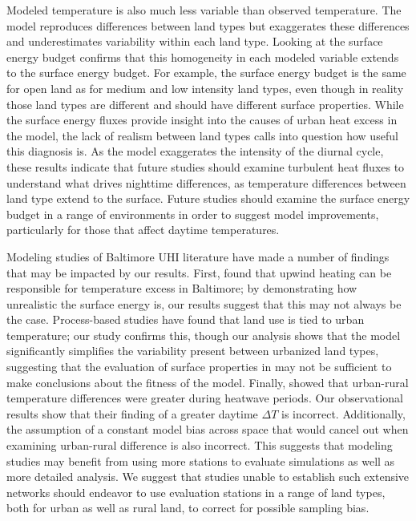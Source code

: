 Modeled temperature is also much less variable than observed temperature. The model reproduces differences between land types but exaggerates these differences and underestimates variability within each land type. Looking at the surface energy budget confirms that this homogeneity in each modeled variable extends to the surface energy budget.  
For example, the surface energy budget is the same for open land as for medium and low intensity land types, even though in reality those land types are different and should have different surface properties. While the surface energy fluxes provide insight into the causes of urban heat excess in the model, the lack of realism between land types calls into question how useful this diagnosis is. 
As the model exaggerates the intensity of the diurnal cycle, these results indicate that future studies should examine turbulent heat fluxes to understand what drives nighttime differences, as temperature differences between land type extend to the surface. Future studies should examine the surface energy budget in a range of environments in order to suggest model improvements, particularly for those that affect daytime temperatures. 

Modeling studies of Baltimore UHI literature have made a number of findings that may be impacted by our results. 
First, \cite{zhang2011impact} found that upwind heating can be responsible for temperature excess in Baltimore; by demonstrating how unrealistic the surface energy is, our results suggest that this may not always be the case.
Process-based studies \cite{li2013modeling} have found that land use is tied to urban temperature; our study confirms this, though our analysis shows that the model significantly simplifies the variability present between urbanized land types, suggesting that the evaluation of surface properties in \cite{li2015contrasting} may not be sufficient to make conclusions about the fitness of the model. 
Finally, \cite{li2013synergistic} showed that urban-rural temperature differences were greater during heatwave periods. Our observational results show that their finding of a greater daytime $\Delta T$ is incorrect. Additionally, the assumption of a constant model bias across space that would cancel out when examining urban-rural difference is also incorrect. 
This suggests that modeling studies may benefit from using more stations to evaluate simulations as well as more detailed analysis. We suggest that studies unable to establish such extensive networks should endeavor to use evaluation stations in a range of land types, both for urban as well as rural land, to correct for possible sampling bias. 

